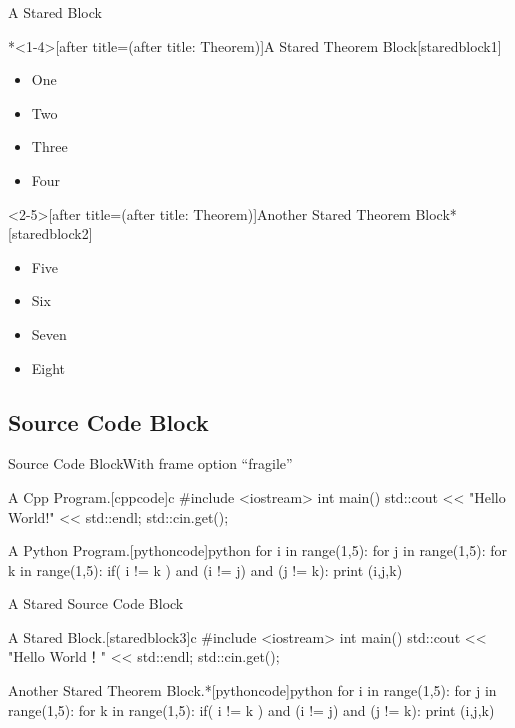 \documentclass[hyperref, UTF8, CJK, aspectratio=169]{beamer}
\begin{document}
\begin{frame}{A Stared Block}
\begin{scutheorem}*<1-4>[after title=(after title: Theorem)]{A Stared Theorem Block}[staredblock1]
	\begin{itemize}[<+->]
		\item One
		\item Two~\only<2>{Two}
		\item \alert<3>{Three}
		\item Four
	\end{itemize}
\end{scutheorem}
\begin{scutheorem}<2-5>[after title=(after title: Theorem)]{Another Stared Theorem Block}*[staredblock2]
	\begin{itemize}
		\item Five
		\item Six~\only<3>{Six}
		\item \alert<3>{Seven}
		\item Eight
	\end{itemize}
\end{scutheorem}
\end{frame}

\subsection{Source Code Block}
\begin{frame}[fragile]{Source Code Block}{With frame option ``fragile''}
	\onslide<2>
	\begin{scucode}{A Cpp Program.}[cppcode]{c}
		#include <iostream>
		int main()
		{
			std::cout << "Hello World!" << std::endl;
			std::cin.get();
		}
	\end{scucode}
	\begin{scucode}{A Python Program.}[pythoncode]{python}
		for i in range(1,5):
			for j in range(1,5):
				for k in range(1,5):
					if( i != k ) and (i != j) and (j != k):
						print (i,j,k)
	\end{scucode}
\end{frame}

\begin{frame}[fragile]{A Stared Source Code Block}
	\begin{scucode*}{A Stared Block.}[staredblock3]{c}
		#include <iostream>
		int main()
		{
			std::cout << "Hello World！" << std::endl;
			std::cin.get();
		}
	\end{scucode*}
	\begin{scucode}{Another Stared Theorem Block.}*[pythoncode]{python}
		for i in range(1,5):
			for j in range(1,5):
				for k in range(1,5):
					if( i != k ) and (i != j) and (j != k):
						print (i,j,k)
	\end{scucode}
\end{frame}
\end{document}
